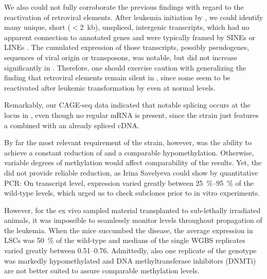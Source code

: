 We also could not fully corroborate the previous findings with regard to the reactivation of retroviral elements. After leukemia initiation by \mllafnine, we could identify many unique, short ($<$\SI{2}{\kilo b}), unspliced, intergenic transcripts, which had no apparent connection to annotated genes and were typically framed by SINEs or LINEs . The cumulated expression of those transcripts, possibly pseudogenes, sequences of viral origin or transposons, was notable, but did not increase  significantly in \dnmtchip {}. Therefore, one should exercise caution with generalizing the finding that retroviral elements remain silent in \dnmtchip, since some seem to be reactivated after leukemic transformation by \mllafnine even at normal  levels.

Remarkably, our CAGE-seq data indicated that notable splicing occurs at the  locus in \dnmtchip, even though no regular mRNA is present, since the strain just features a \dnmtnegallele combined with an already spliced  cDNA.  

By far the most relevant requirement of the strain, however, was the ability to achieve a constant reduction of  and a comparable hypomethylation. Otherwise, variable degrees of methylation would affect comparability of the results. Yet, the \dnmtchipallele did not provide reliable  reduction, as Irina Savelyeva could show by quantitative PCR: On transcript level, expression varied greatly between \SIrange{25}{95}{\percent} of the wild-type levels\dns, which urged us to check subclones prior to in vitro experiments. 

However, for the ex vivo sampled material transplanted to sub-lethally irradiated animals\cite{Vockentanz2011}, it was impossible to seamlessly monitor  levels throughout propagation of the leukemia. When the mice succumbed the disease, the average  expression in LSCs was \SI{50}{\percent} of the wild-type  and medians of the single WGBS replicates varied greatly between \numrange{0.51}{0.76}. Admittedly, also one replicate of the \dnmtwt genotype was markedly hypomethylated  and DNA methyltransferase inhibitors (DNMTi) are not better suited to assure comparable methylation levels.  

